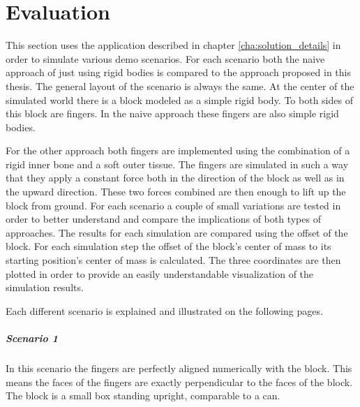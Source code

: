 \chapter{Evaluation}
\label{cha:evaluation}

This section uses the application described in chapter \ref{cha:solution_details} in order to simulate various demo scenarios. For each scenario both the naive approach of just using rigid bodies is compared to the approach proposed in this thesis. The general layout of the scenario is always the same. At the center of the simulated world there is a block modeled as a simple rigid body. To both sides of this block are fingers. In the naive approach these fingers are also simple rigid bodies. 

For the other approach both fingers are implemented using the combination of a rigid inner bone and a soft outer tissue. The fingers are simulated in such a way that they apply a constant force both in the direction of the block as well as in the upward direction. These two forces combined are then enough to lift up the block from ground. For each scenario a couple of small variations are tested in order to better understand and compare the implications of both types of approaches. The results for each simulation are compared using the offset of the block. For each simulation step the offset of the block's center of mass to its starting position's center of mass is calculated. The three coordinates are then plotted in order to provide an easily understandable visualization of the simulation results. 

Each different scenario is explained and illustrated on the following pages.

\clearpage

\paragraph{Scenario 1}
In this scenario the fingers are perfectly aligned numerically with the block. This means the faces of the fingers are exactly perpendicular to the faces of the block. The block is a small box standing upright, comparable to a can.

